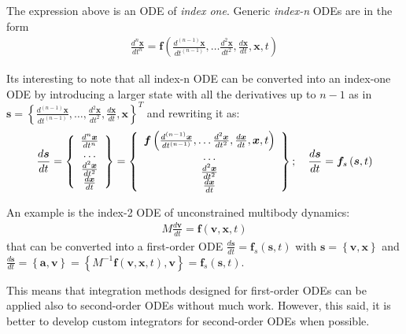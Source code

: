 \documentclass{digitaldynamics}
\def\vect#1{\bm{#1}}
\def\matr#1{{#1}}
\begin{document}
The expression above is an ODE of \textit{index one}. Generic \textit{index-n} ODEs are in the form
%
\begin{align}
  \frac{d^n\vect{\vect{x}}}{dt^n}  = \vect{f} 
	\left( 
	\frac{d^{(n-1)}\vect{\vect{x}}}{dt^{(n-1)}},
	\ldots
	\frac{d^2\vect{\vect{x}}}{dt^2},
	\frac{d\vect{\vect{x}}}{dt},
	\vect{x}, t\right)
\end{align}

Its interesting to note that all index-n ODE can be converted into an index-one ODE by introducing a larger state with all the derivatives up to $n-1$ as in  $\vect{s}=\left\{\frac{d^{(n-1)}\vect{\vect{x}}}{dt^{(n-1)}}, \ldots, \frac{d^2\vect{\vect{x}}}{dt^2}, \frac{d\vect{\vect{x}}}{dt}, \vect{x} \right\}^T$ and rewriting it as:
%
\begin{align}
\frac{d\vect{\vect{s}}}{dt}  = 
\left\{
\begin{array}[pos]{c}
\frac{d^n\vect{\vect{x}}}{dt^n} \\
\ldots \\
\frac{d^2\vect{\vect{x}}}{dt^2} \\
\frac{d\vect{\vect{x}}}{dt}
\end{array}
\right\}
=
\left\{
\begin{array}[pos]{c}
\vect{f} 
	\left( 
	\frac{d^{(n-1)}\vect{\vect{x}}}{dt^{(n-1)}},
	\ldots
	\frac{d^2\vect{\vect{x}}}{dt^2},
	\frac{d\vect{\vect{x}}}{dt},
	\vect{x}, t\right) \\
\ldots \\
\frac{d^2\vect{\vect{x}}}{dt^2} \\
\frac{d\vect{\vect{x}}}{dt}
\end{array}
\right\};
\quad
\frac{d\vect{\vect{s}}}{dt}  = \vect{f}_s \left( \vect{s}, t\right)
\end{align}

An example is the index-2 ODE of unconstrained multibody dynamics: 
%
\begin{align}
  \matr{M} \frac{d\vect{\vect{v}}}{dt}  = \vect{f} \left( \vect{v},\vect{x}, t \right)  
	\label{eq:odemechanics}
\end{align}
%
that can be converted into a first-order ODE $\frac{d\vect{\vect{s}}}{dt}  = \vect{f}_s \left( \vect{s}, t \right)$ with $\vect{s} = \left\{ \vect{v}, \vect{x} \right\}$ and $\frac{d\vect{\vect{s}}}{dt}  = \left\{ \vect{a}, \vect{v} \right\} = \left\{ \matr{M}^{-1}\vect{f}(\vect{v},\vect{x}, t), \vect{v} \right\} = \vect{f}_s \left( \vect{s}, t \right)$.

This means that integration methods designed for first-order ODEs can be applied also to second-order ODEs without much work. However, this said, it is better to develop custom integrators for second-order ODEs when possible. %
\end{document}
